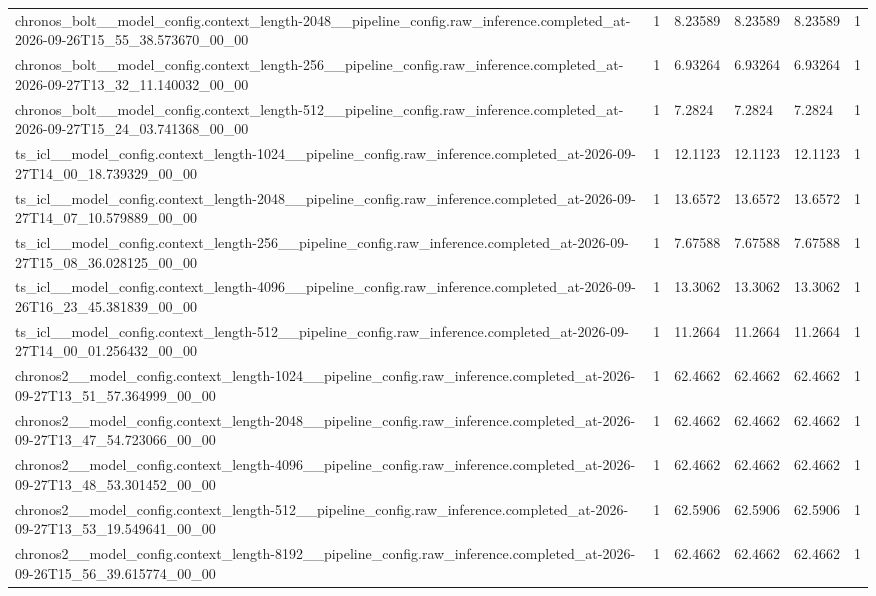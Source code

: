 \begin{tabular}{llllll}
chronos\_bolt\_\_model\_config.context\_length-2048\_\_pipeline\_config.raw\_inference.completed\_at-2026-09-26T15\_55\_38.573670\_00\_00 & 1 & 8.23589 & 8.23589 & 8.23589 & 1 \\
chronos\_bolt\_\_model\_config.context\_length-256\_\_pipeline\_config.raw\_inference.completed\_at-2026-09-27T13\_32\_11.140032\_00\_00 & 1 & 6.93264 & 6.93264 & 6.93264 & 1 \\
chronos\_bolt\_\_model\_config.context\_length-512\_\_pipeline\_config.raw\_inference.completed\_at-2026-09-27T15\_24\_03.741368\_00\_00 & 1 & 7.2824 & 7.2824 & 7.2824 & 1 \\
ts\_icl\_\_model\_config.context\_length-1024\_\_pipeline\_config.raw\_inference.completed\_at-2026-09-27T14\_00\_18.739329\_00\_00 & 1 & 12.1123 & 12.1123 & 12.1123 & 1 \\
ts\_icl\_\_model\_config.context\_length-2048\_\_pipeline\_config.raw\_inference.completed\_at-2026-09-27T14\_07\_10.579889\_00\_00 & 1 & 13.6572 & 13.6572 & 13.6572 & 1 \\
ts\_icl\_\_model\_config.context\_length-256\_\_pipeline\_config.raw\_inference.completed\_at-2026-09-27T15\_08\_36.028125\_00\_00 & 1 & 7.67588 & 7.67588 & 7.67588 & 1 \\
ts\_icl\_\_model\_config.context\_length-4096\_\_pipeline\_config.raw\_inference.completed\_at-2026-09-26T16\_23\_45.381839\_00\_00 & 1 & 13.3062 & 13.3062 & 13.3062 & 1 \\
ts\_icl\_\_model\_config.context\_length-512\_\_pipeline\_config.raw\_inference.completed\_at-2026-09-27T14\_00\_01.256432\_00\_00 & 1 & 11.2664 & 11.2664 & 11.2664 & 1 \\
chronos2\_\_model\_config.context\_length-1024\_\_pipeline\_config.raw\_inference.completed\_at-2026-09-27T13\_51\_57.364999\_00\_00 & 1 & 62.4662 & 62.4662 & 62.4662 & 1 \\
chronos2\_\_model\_config.context\_length-2048\_\_pipeline\_config.raw\_inference.completed\_at-2026-09-27T13\_47\_54.723066\_00\_00 & 1 & 62.4662 & 62.4662 & 62.4662 & 1 \\
chronos2\_\_model\_config.context\_length-4096\_\_pipeline\_config.raw\_inference.completed\_at-2026-09-27T13\_48\_53.301452\_00\_00 & 1 & 62.4662 & 62.4662 & 62.4662 & 1 \\
chronos2\_\_model\_config.context\_length-512\_\_pipeline\_config.raw\_inference.completed\_at-2026-09-27T13\_53\_19.549641\_00\_00 & 1 & 62.5906 & 62.5906 & 62.5906 & 1 \\
chronos2\_\_model\_config.context\_length-8192\_\_pipeline\_config.raw\_inference.completed\_at-2026-09-26T15\_56\_39.615774\_00\_00 & 1 & 62.4662 & 62.4662 & 62.4662 & 1 \\

\end{tabular}
